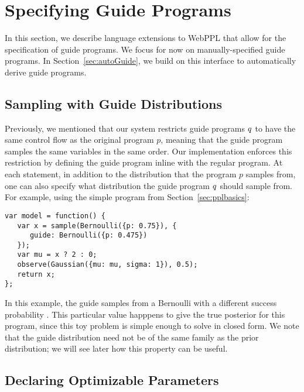 \section{Specifying Guide Programs}
\label{sec:guideSpec}

In this section, we describe language extensions to WebPPL that allow for the specification of guide programs.
We focus for now on manually-specified guide programs. In Section~\ref{sec:autoGuide}, we build on this interface to automatically derive guide programs.

\subsection{Sampling with Guide Distributions}

Previously, we mentioned that our system restricts guide programs $q$ to have the same control flow as the original program $p$, meaning that the guide program samples the same variables in the same order.
Our implementation enforces this restriction by defining the guide program inline with the regular program.
At each  statement, in addition to the distribution that the program $p$ samples from, one can also specify what distribution the guide program $q$ should sample from. For example, using the simple program from Section~\ref{sec:pplbasics}:
\begin{lstlisting}
var model = function() {
   var x = sample(Bernoulli({p: 0.75}), {
      guide: Bernoulli({p: 0.475})
   });
   var mu = x ? 2 : 0;
   observe(Gaussian({mu: mu, sigma: 1}), 0.5);
   return x;
};
\end{lstlisting}
In this example, the guide samples from a Bernoulli with a different success probability . This particular value happpens to give the true posterior for this program, since this toy problem is simple enough to solve in closed form.
We note that the guide distribution need not be of the same family as the prior distribution; we will see later how this property can be useful.

\subsection{Declaring Optimizable Parameters}

